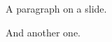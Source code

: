 \documentclass{beamer}
\begin{document}
\begin{frame}
  A paragraph on a slide.

  And another one.
\end{frame}
\end{document}
